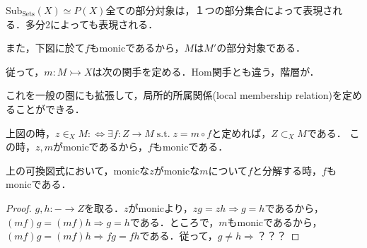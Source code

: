 \documentclass[uplatex, 12pt, dvipdfmx]{jsarticle}
\begin{document}
\begin{example*}
    $\mathrm{Sub}_{\mathrm{Sets}}(X)\simeq P(X)$全ての部分対象は，１つの部分集合によって表現される．多分2によっても表現される．

    また，下図に於て$f$もmonicであるから，$M$は$M'$の部分対象である．
    \begin{center}
    \end{center}
    従って，$m:M\rightarrowtail X$は次の関手を定める．Hom関手とも違う，階層が．
    \begin{center}
    \end{center}

    これを一般の圏にも拡張して，局所的所属関係(local membership relation)を定めることができる．
    \begin{center}
    \end{center}
    上図の時，$z\in_XM:\Leftrightarrow \exists f:Z\to M\;\mathrm{s.t.}\; z=m\circ f$と定めれば，$Z\subset_X M$である．
    この時，$z,m$がmonicであるから，$f$もmonicである．
    \begin{proposition*}[???]
        上の可換図式において，monicな$z$がmonicな$m$について$f$と分解する時，$f$もmonicである．
    \end{proposition*}
    \begin{proof}
        $g,h:-\to Z$を取る．$z$がmonicより，$zg=zh\Rightarrow g=h$であるから，$(mf)g=(mf)h\Rightarrow g=h$である．ところで，$m$もmonicであるから，$(mf)g=(mf)h\Rightarrow fg=fh$である．従って，$g\ne h\Rightarrow $？？？
    \end{proof}
\end{example*}
\end{document}
